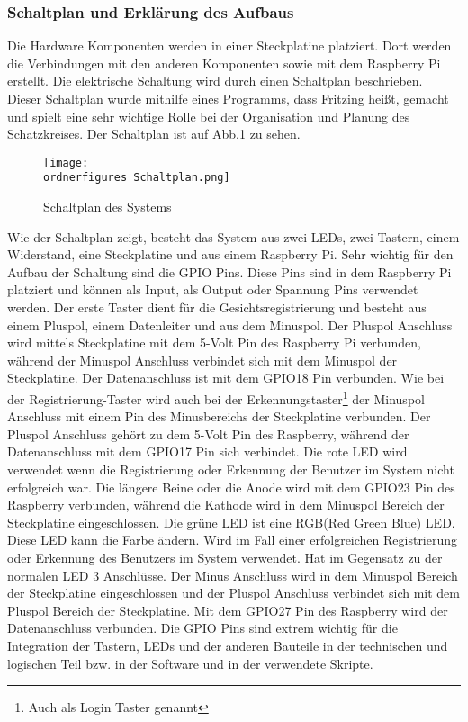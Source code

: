 		\subsubsection{Schaltplan und Erklärung des Aufbaus}
Die Hardware Komponenten werden in einer Steckplatine platziert. Dort werden die Verbindungen mit den anderen Komponenten sowie mit dem Raspberry Pi erstellt. Die elektrische Schaltung wird durch einen Schaltplan beschrieben. Dieser Schaltplan wurde mithilfe eines Programms, dass Fritzing heißt, gemacht und spielt eine sehr wichtige Rolle bei der Organisation und Planung des Schatzkreises. Der Schaltplan ist auf Abb.\ref{fig:Schaltplan} zu sehen.
\begin{figure}[H]
	\texttt{[image: \\ordnerfigures Schaltplan.png]}
	\caption{Schaltplan des Systems}
	\label{fig:Schaltplan}
\end{figure}
Wie der Schaltplan zeigt, besteht das System aus zwei LEDs, zwei Tastern, einem Widerstand, eine Steckplatine und aus einem Raspberry Pi. Sehr wichtig für den Aufbau der Schaltung sind die GPIO Pins. Diese Pins sind in dem Raspberry Pi platziert und können als Input, als Output oder Spannung Pins verwendet werden. 
Der erste Taster dient für die Gesichtsregistrierung und besteht aus einem Pluspol, einem Datenleiter und aus dem Minuspol. Der Pluspol Anschluss wird mittels Steckplatine mit dem 5-Volt Pin des Raspberry Pi verbunden, während der Minuspol Anschluss verbindet sich mit dem Minuspol der Steckplatine. Der Datenanschluss ist mit dem GPIO18 Pin verbunden. Wie bei der Registrierung-Taster wird auch bei der Erkennungstaster\footnote{Auch als Login Taster genannt} der Minuspol Anschluss mit einem Pin des Minusbereichs der Steckplatine verbunden. Der Pluspol Anschluss gehört zu dem 5-Volt Pin des Raspberry, während der Datenanschluss mit dem GPIO17 Pin sich verbindet. Die rote LED wird verwendet wenn die Registrierung oder Erkennung der Benutzer im System nicht erfolgreich war. Die längere Beine oder die Anode wird mit dem GPIO23 Pin des Raspberry verbunden, während die Kathode wird in dem Minuspol Bereich der Steckplatine eingeschlossen. Die grüne LED ist eine RGB(Red Green Blue) LED. Diese LED kann die Farbe ändern. Wird im Fall einer erfolgreichen Registrierung oder Erkennung des Benutzers im System verwendet. Hat im Gegensatz zu der normalen LED 3 Anschlüsse. Der Minus Anschluss wird in dem Minuspol Bereich der Steckplatine eingeschlossen und der Pluspol Anschluss verbindet sich mit dem Pluspol Bereich der Steckplatine. Mit dem GPIO27 Pin des Raspberry wird der Datenanschluss verbunden. Die GPIO Pins sind extrem wichtig für die Integration der Tastern, LEDs und der anderen Bauteile in der technischen und logischen Teil bzw. in der Software und in der verwendete Skripte. 
